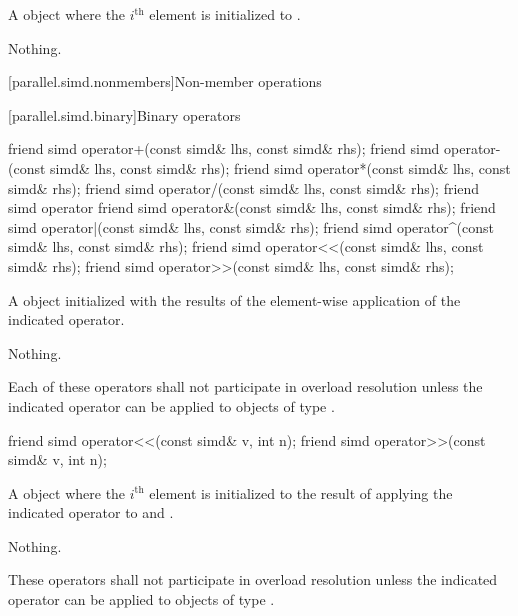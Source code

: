 \begin{itemdescr}
  \pnum\returns
  A  object where the $i^\text{th}$ element is initialized to  \foralli.

  \pnum\throws Nothing.
\end{itemdescr}

[parallel.simd.nonmembers]{Non-member operations}

[parallel.simd.binary]{Binary operators}

\begin{itemdecl}
friend simd operator+(const simd& lhs, const simd& rhs);
friend simd operator-(const simd& lhs, const simd& rhs);
friend simd operator*(const simd& lhs, const simd& rhs);
friend simd operator/(const simd& lhs, const simd& rhs);
friend simd operator%
friend simd operator&(const simd& lhs, const simd& rhs);
friend simd operator|(const simd& lhs, const simd& rhs);
friend simd operator^(const simd& lhs, const simd& rhs);
friend simd operator<<(const simd& lhs, const simd& rhs);
friend simd operator>>(const simd& lhs, const simd& rhs);
\end{itemdecl}

\begin{itemdescr}
  \pnum\returns
  A  object initialized with the results of the element-wise application of the indicated operator.

  \pnum\throws Nothing.

  \pnum\remarks
  Each of these operators shall not participate in overload resolution unless the indicated operator can be applied to objects of type .
\end{itemdescr}

\begin{itemdecl}
friend simd operator<<(const simd& v, int n);
friend simd operator>>(const simd& v, int n);
\end{itemdecl}

\begin{itemdescr}
  \pnum\returns
  A  object where the $i^\text{th}$ element is initialized to the result of applying the indicated operator to  and  \foralli.

  \pnum\throws Nothing.

  \pnum\remarks
  These operators shall not participate in overload resolution unless the indicated operator can be applied to objects of type .
\end{itemdescr}

